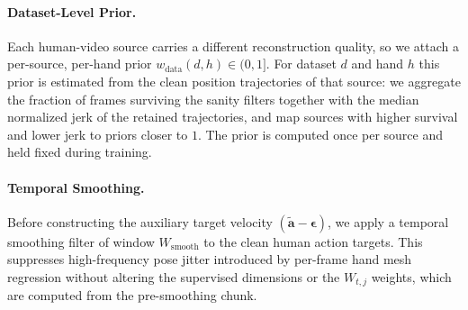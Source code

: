 \paragraph{Dataset-Level Prior.}
Each human-video source carries a different reconstruction quality, so we attach a per-source, per-hand prior $w_{\mathrm{data}}(d,h) \in (0,1]$. For dataset $d$ and hand $h$ this prior is estimated from the clean position trajectories of that source: we aggregate the fraction of frames surviving the sanity filters together with the median normalized jerk of the retained trajectories, and map sources with higher survival and lower jerk to priors closer to $1$. The prior is computed once per source and held fixed during training.

\paragraph{Temporal Smoothing.}
Before constructing the auxiliary target velocity $(\tilde{\mathbf{a}} - \boldsymbol{\epsilon})$, we apply a temporal smoothing filter of window $W_{\mathrm{smooth}}$ to the clean human action targets. This suppresses high-frequency pose jitter introduced by per-frame hand mesh regression without altering the supervised dimensions or the $W_{t,j}$ weights, which are computed from the pre-smoothing chunk.


